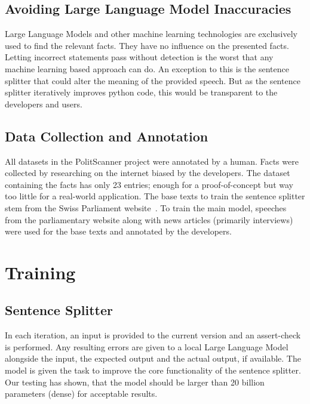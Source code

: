 \documentclass[a4paper,11pt]{report}
\begin{document}
	    \section{Avoiding Large Language Model Inaccuracies}\label{sec:avoiding-large-language-model-inaccuracies}
			Large Language Models and other machine learning technologies are exclusively used to find the relevant facts.
            They have no influence on the presented facts.
	        Letting incorrect statements pass without detection is the worst that any machine learning based approach can do.
			An exception to this is the sentence splitter that could alter the meaning of the provided speech.
	        But as the sentence splitter iteratively improves python code, this would be transparent to the developers and users.

	    \section{Data Collection and Annotation}\label{sec:data-collection-and-annotation}
			All datasets in the PolitScanner project were annotated by a human.
			Facts were collected by researching on the internet biased by the developers.
			The dataset containing the facts has only 23 entries; enough for a proof-of-concept but way too little for a real-world application.
            The base texts to train the sentence splitter stem from the Swiss Parliament website~\cite{parliamentCH}.
	        To train the main model, speeches from the parliamentary website along with news articles (primarily interviews) were used for the base texts and annotated by the developers.

	\chapter{Training}\label{ch:training}
		\section{Sentence Splitter}\label{sec:sentence-splitter}
	        In each iteration, an input is provided to the current version and an assert-check is performed.
	        Any resulting errors are given to a local Large Language Model alongside the input, the expected output and the actual output, if available.
	        The model is given the task to improve the core functionality of the sentence splitter.
	        Our testing has shown, that the model should be larger than 20 billion parameters (dense) for acceptable results.
\end{document}
